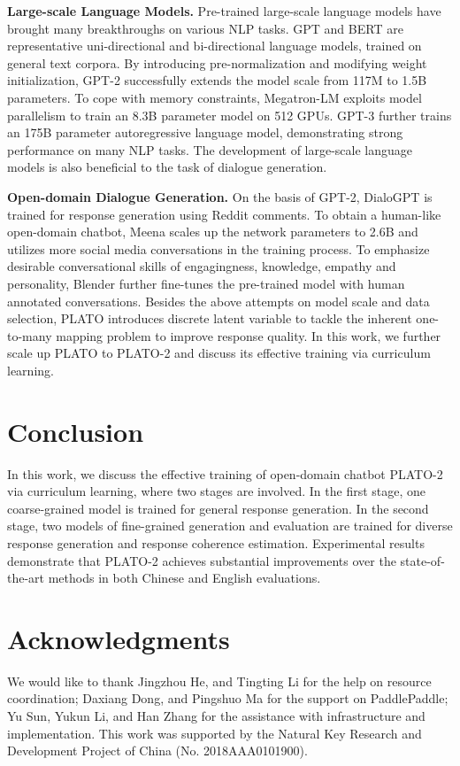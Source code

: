 \documentclass[11pt,a4paper]{article}
\begin{document}
	\noindent \textbf{Large-scale Language Models.} Pre-trained large-scale language models have brought many breakthroughs on various NLP tasks. GPT \cite{radford2018improving} and BERT \cite{devlin2019bert} are representative uni-directional and bi-directional language models, trained on general text corpora. By introducing pre-normalization and modifying weight initialization, GPT-2 \cite{radford2019language} successfully extends the model scale from 117M to 1.5B parameters. To cope with memory constraints, Megatron-LM \cite{shoeybi2019megatron} exploits model parallelism to train an 8.3B parameter model on 512 GPUs. GPT-3 \cite{brown2020language} further trains an 175B parameter autoregressive language model, demonstrating strong performance on many NLP tasks. The development of large-scale language models is also beneficial to the task of dialogue generation. 
	
	\noindent \textbf{Open-domain Dialogue Generation.} On the basis of GPT-2, DialoGPT \cite{zhang2019dialogpt} is trained for response generation using Reddit comments. To obtain a human-like open-domain chatbot, Meena \cite{adiwardana2020towards} scales up the network parameters to 2.6B and utilizes more social media conversations in the training process. To emphasize desirable conversational skills of engagingness, knowledge, empathy and personality, Blender \cite{roller2020recipes} further fine-tunes the pre-trained model with human annotated conversations. Besides the above attempts on model scale and data selection, PLATO \cite{bao2019know} introduces discrete latent variable to tackle the inherent one-to-many mapping problem to improve response quality. In this work, we further scale up PLATO to PLATO-2 and discuss its effective training via curriculum learning.
	
	\section{Conclusion}
	In this work, we discuss the effective training of open-domain chatbot PLATO-2 via curriculum learning, where two stages are involved. In the first stage, one coarse-grained model is trained for general response generation. In the second stage, two models of fine-grained generation and evaluation are trained for diverse response generation and response coherence estimation. Experimental results demonstrate that PLATO-2 achieves substantial improvements over the state-of-the-art methods in both Chinese and English evaluations.  
	
	\section*{Acknowledgments}
	We would like to thank Jingzhou He, and Tingting Li for the help on resource coordination; Daxiang Dong, and Pingshuo Ma for the support on PaddlePaddle; Yu Sun, Yukun Li, and Han Zhang for the assistance with infrastructure and implementation. This work was supported by the Natural Key Research and Development Project of China (No. 2018AAA0101900).
	
\end{document}
